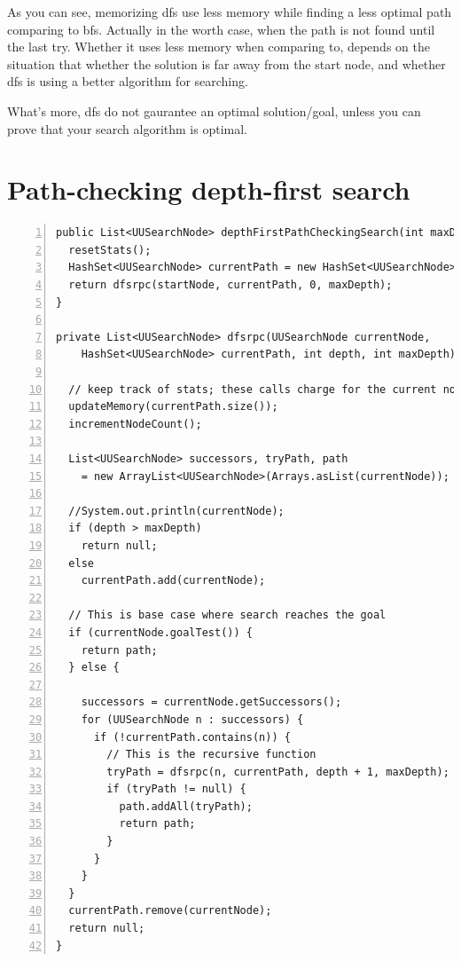 \documentclass{article}
\begin{document}
As you can see, memorizing dfs use less memory while finding a less optimal path comparing to bfs. Actually in the worth case, when the path is not found until the last try. Whether it uses less memory when comparing to, depends on the situation that whether the solution is far away from the start node, and whether dfs is using a better algorithm for searching. 

What's more, dfs do not gaurantee an optimal solution/goal, unless you can prove that your search algorithm is optimal. 















\section{Path-checking depth-first search}

\begin{lstlisting}[numbers=left]
public List<UUSearchNode> depthFirstPathCheckingSearch(int maxDepth) {
  resetStats();
  HashSet<UUSearchNode> currentPath = new HashSet<UUSearchNode>();
  return dfsrpc(startNode, currentPath, 0, maxDepth);
}

private List<UUSearchNode> dfsrpc(UUSearchNode currentNode,
    HashSet<UUSearchNode> currentPath, int depth, int maxDepth) {

  // keep track of stats; these calls charge for the current node
  updateMemory(currentPath.size());
  incrementNodeCount();

  List<UUSearchNode> successors, tryPath, path 
  	= new ArrayList<UUSearchNode>(Arrays.asList(currentNode));

  //System.out.println(currentNode);
  if (depth > maxDepth)
    return null;
  else 
    currentPath.add(currentNode);

  // This is base case where search reaches the goal
  if (currentNode.goalTest()) {
    return path;
  } else {
  
    successors = currentNode.getSuccessors();
    for (UUSearchNode n : successors) {
      if (!currentPath.contains(n)) {
        // This is the recursive function
        tryPath = dfsrpc(n, currentPath, depth + 1, maxDepth);
        if (tryPath != null) {
          path.addAll(tryPath);
          return path;
        }
      }
    }
  }
  currentPath.remove(currentNode);
  return null;
}
\end{lstlisting}
\end{document}
